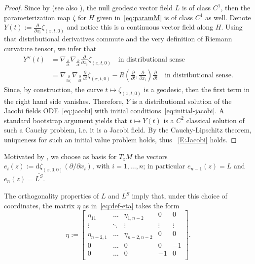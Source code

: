 \documentclass[12pt,a4paper]{amsart}
\theoremstyle{plain}
\theoremstyle{definition}
\numberwithin{equation}{section}
\newcommand{\de}{{\mathrm{d}}}
\newcommand{\lparam}{\zeta}
\begin{document}
\begin{proof}
Since by  (see also ), the null geodesic vector field $L$ is of class $C^1$, then the parameterization map $\lparam$ for $H$ given in~\eqref{eq:paramM} is of class $C^1$ as well.
Denote $Y(t):=\frac{\partial}{\partial x_i} \lparam_{(x,t,0)}$ and notice this is a continuous vector field along $H$. Using that distributional derivatives commute and the very definition of Riemann curvature tensor, we infer that
\begin{align*}
Y''(t)&= \nabla_{\frac{\partial}{\partial t}} \nabla_{\frac{\partial}{\partial t}}\frac{\partial}{\partial x_i} \lparam_{(x,t,0)} \quad \text{in distributional sense} \\
& =\nabla_{\frac{\partial}{\partial x_i}} \nabla_{\frac{\partial}{\partial t}}\frac{\partial}{\partial t} \lparam_{(x,t,0)}- R\left(\frac{\partial}{\partial t}, \frac{\partial}{\partial x_i}  \right) \frac{\partial}{\partial t}  \quad \text{in distributional sense}.
\end{align*}
Since, by construction, the curve $t\mapsto \lparam_{(x,t,0)}$ is a geodesic, then the first term in the right hand side vanishes. Therefore, $Y$ is a distributional solution of the Jacobi fields ODE~\eqref{eq:jacobi} with initial conditions~\eqref{eq:initial-jacobi}. A standard bootstrap argument yields that $t\mapsto Y(t)$ is a $C^2$ classical solution of such a Cauchy problem, i.e. it is a Jacobi field. By the Cauchy-Lipschitz theorem, uniqueness for such an initial value problem holds, thus ~\eqref{E:Jacobi} holds.
\end{proof}


Motivated by , we  choose as basis for $T_{z}M$ the vectors $e_{i}(z)
  :=
  \de\lparam_{(x,0,0)}
  \left( \partial /\partial x_i \right)
$, 
with $i = 1, \dots, n$;
in particular $e_{n-1}(z)=L$ and $e_{n}(z)=\overline{L^S}$.


The orthogonality properties of $L$ and $\overline{L^S}$ imply that,
under this choice of coordinates,
the matrix $\eta$ as in~\eqref{eq:def-eta} takes the form
\begin{equation}\label{E:eta-non-orthogonal}
  \eta
  :=
  \begin{bmatrix}
    \eta_{11} & \dots &\eta_{1,n-2} & 0 &0\\
    \vdots & \ddots &\vdots &\vdots&\vdots\\
    \eta_{n-2,1}&\dots & \eta_{n-2,n-2} &0 &0 \\
    0&\dots & 0 &0 &-1 \\
    0&\dots & 0 &-1 &0 \\
  \end{bmatrix}.
\end{equation}
\end{document}

